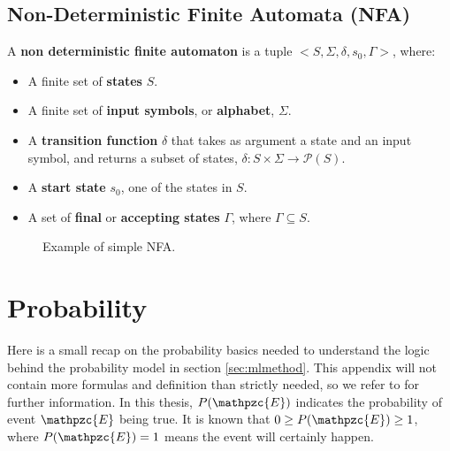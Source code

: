 \subsection{Non-Deterministic Finite Automata (NFA)}
\begin{definition}
\label{def:nondetsm}
A \textbf{non deterministic finite automaton} is a tuple $<S, \Sigma, \delta, s_0, \Gamma>$, where:
\begin{itemize}
\item A finite set of \textbf{states} $S$.
\item A finite set of \textbf{input symbols}, or \textbf{alphabet}, $\Sigma$.
\item A \textbf{transition function} $\delta$ that takes as argument a state and an input symbol, and returns a subset of states, $\delta: S \times \Sigma \rightarrow \mathcal{P}(S)$. 
\item A \textbf{start state} $s_0$, one of the states in $S$.
\item A set of \textbf{final} or \textbf{accepting states} $\Gamma$, where $\Gamma \subseteq S$.
\end{itemize}
\end{definition}

\begin{figure}[H]
\centering
{}
\caption{Example of simple NFA.\protect\footnotemark}\label{fig:NFA}
\end{figure}

\section{Probability}
Here is a small recap on the probability basics needed to understand the logic behind the probability model in section \ref{sec:mlmethod}. This appendix will not contain more formulas and definition than strictly needed, so we refer to \cite{murphy2012machine} for further information.
In this thesis, $P(\mathpzc{E})$ indicates the probability of event $\mathpzc{E}$ being true. It is known that $0\geq P(\mathpzc{E})\geq 1$, where $P(\mathpzc{E})=1$ means the event will certainly happen.
